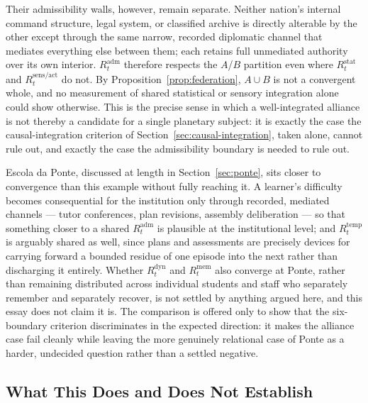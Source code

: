 \documentclass[11pt]{article}
\begin{document}
Their admissibility walls, however, remain separate. Neither nation's internal command structure, legal system, or classified archive is directly alterable by the other except through the same narrow, recorded diplomatic channel that mediates everything else between them; each retains full unmediated authority over its own interior. $R^{\mathrm{adm}}_t$ therefore respects the $A$/$B$ partition even where $R^{\mathrm{stat}}_t$ and $R^{\mathrm{sens/act}}_t$ do not. By Proposition~\ref{prop:federation}, $A\cup B$ is not a convergent whole, and no measurement of shared statistical or sensory integration alone could show otherwise. This is the precise sense in which a well-integrated alliance is not thereby a candidate for a single planetary subject: it is exactly the case the causal-integration criterion of Section~\ref{sec:causal-integration}, taken alone, cannot rule out, and exactly the case the admissibility boundary is needed to rule out.

Escola da Ponte, discussed at length in Section~\ref{sec:ponte}, sits closer to convergence than this example without fully reaching it. A learner's difficulty becomes consequential for the institution only through recorded, mediated channels --- tutor conferences, plan revisions, assembly deliberation --- so that something closer to a shared $R^{\mathrm{adm}}_t$ is plausible at the institutional level; and $R^{\mathrm{temp}}_t$ is arguably shared as well, since plans and assessments are precisely devices for carrying forward a bounded residue of one episode into the next rather than discharging it entirely. Whether $R^{\mathrm{dyn}}_t$ and $R^{\mathrm{mem}}_t$ also converge at Ponte, rather than remaining distributed across individual students and staff who separately remember and separately recover, is not settled by anything argued here, and this essay does not claim it is. The comparison is offered only to show that the six-boundary criterion discriminates in the expected direction: it makes the alliance case fail cleanly while leaving the more genuinely relational case of Ponte as a harder, undecided question rather than a settled negative.

\subsection{What This Does and Does Not Establish}
\end{document}
